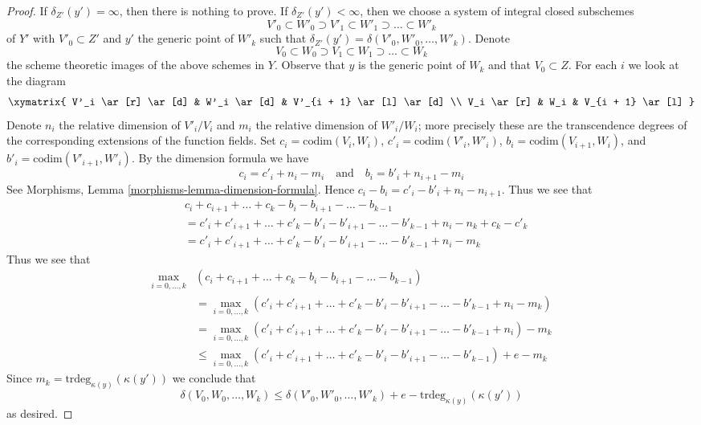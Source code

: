 \begin{proof}
If $\delta_{Z'}(y') = \infty$, then there is nothing to prove.
If $\delta_{Z'}(y') < \infty$, then we choose a system
of integral closed subschemes
$$
V'_0 \subset W'_0 \supset V'_1 \subset W'_1 \supset \ldots \subset W'_k
$$
of $Y'$ with $V'_0 \subset Z'$ and $y'$ the generic point of $W'_k$
such that $\delta_{Z'}(y') = \delta(V'_0, W'_0, \ldots, W'_k)$.
Denote
$$
V_0 \subset W_0 \supset V_1 \subset W_1 \supset \ldots \subset W_k
$$
the scheme theoretic images of the above schemes in $Y$. Observe
that $y$ is the generic point of $W_k$ and that $V_0 \subset Z$.
For each $i$ we look at the diagram
$$
\xymatrix{
V'_i \ar[r] \ar[d] & W'_i \ar[d] & V'_{i + 1} \ar[l] \ar[d] \\
V_i \ar[r] & W_i & V_{i + 1} \ar[l]
}
$$
Denote $n_i$ the relative dimension of $V'_i/V_i$ and
$m_i$ the relative dimension of $W'_i/W_i$; more precisely
these are the transcendence degrees of the corresponding extensions of
the function fields. Set
$c_i = \text{codim}(V_i, W_i)$,
$c'_i = \text{codim}(V'_i, W'_i)$,
$b_i = \text{codim}(V_{i + 1}, W_i)$, and
$b'_i = \text{codim}(V'_{i + 1}, W'_i)$.
By the dimension formula we have
$$
c_i = c'_i + n_i - m_i
\quad\text{and}\quad
b_i = b'_i + n_{i + 1} - m_i
$$
See Morphisms, Lemma \ref{morphisms-lemma-dimension-formula}.
Hence $c_i - b_i = c'_i - b'_i + n_i - n_{i + 1}$. Thus we see that
\begin{align*}
& c_i + c_{i + 1} + \ldots + c_k - b_i - b_{i + 1} - \ldots - b_{k - 1} \\
& =
c'_i + c'_{i + 1} + \ldots + c'_k - b'_i - b'_{i + 1} - \ldots - b'_{k - 1}
+ n_i - n_k + c_k - c'_k \\
& =
c'_i + c'_{i + 1} + \ldots + c'_k - b'_i - b'_{i + 1} - \ldots - b'_{k - 1}
+ n_i - m_k
\end{align*}
Thus we see that
\begin{align*}
\max_{i = 0, \ldots, k}
& (c_i + c_{i + 1} + \ldots + c_k - b_i - b_{i + 1} - \ldots - b_{k - 1}) \\
& =
\max_{i = 0, \ldots, k}
(c'_i + c'_{i + 1} + \ldots + c'_k - b'_i - b'_{i + 1} - \ldots - b'_{k - 1}
+ n_i - m_k) \\
& =
\max_{i = 0, \ldots, k}
(c'_i + c'_{i + 1} + \ldots + c'_k - b'_i - b'_{i + 1} - \ldots - b'_{k - 1}
+ n_i) - m_k \\
& \leq
\max_{i = 0, \ldots, k}
(c'_i + c'_{i + 1} + \ldots + c'_k - b'_i - b'_{i + 1} - \ldots - b'_{k - 1})
+ e - m_k
\end{align*}
Since $m_k = \text{trdeg}_{\kappa(y)}(\kappa(y'))$ we conclude that
$$
\delta(V_0, W_0, \ldots, W_k) \leq
\delta(V'_0, W'_0, \ldots, W'_k) + e - \text{trdeg}_{\kappa(y)}(\kappa(y'))
$$
as desired.
\end{proof}

